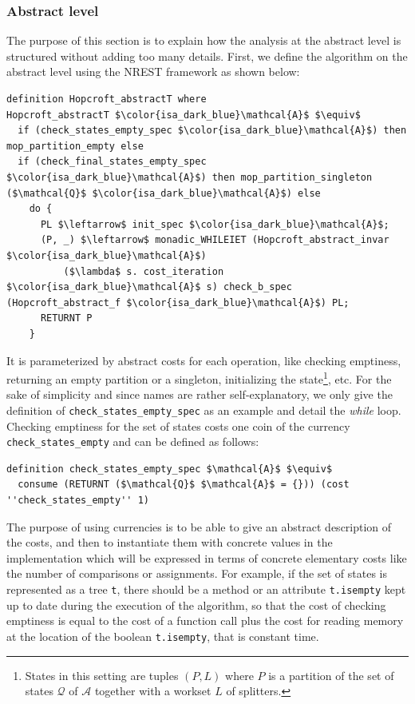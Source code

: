 \documentclass[12pt, a4 paper]{article}
\theoremstyle{definition}
\begin{document}
\subsubsection{Abstract level}
The purpose of this section is to explain how the analysis at the abstract level is structured without adding too many details.
First, we define the algorithm on the abstract level using the NREST framework as shown below:
\begin{lstlisting}[language=Isabelle]
definition Hopcroft_abstractT where
Hopcroft_abstractT $\color{isa_dark_blue}\mathcal{A}$ $\equiv$
  if (check_states_empty_spec $\color{isa_dark_blue}\mathcal{A}$) then mop_partition_empty else 
  if (check_final_states_empty_spec $\color{isa_dark_blue}\mathcal{A}$) then mop_partition_singleton ($\mathcal{Q}$ $\color{isa_dark_blue}\mathcal{A}$) else
    do {
      PL $\leftarrow$ init_spec $\color{isa_dark_blue}\mathcal{A}$;
      (P, _) $\leftarrow$ monadic_WHILEIET (Hopcroft_abstract_invar $\color{isa_dark_blue}\mathcal{A}$) 
          ($\lambda$ s. cost_iteration $\color{isa_dark_blue}\mathcal{A}$ s) check_b_spec (Hopcroft_abstract_f $\color{isa_dark_blue}\mathcal{A}$) PL;
      RETURNT P
    }
\end{lstlisting}
It is parameterized by abstract costs for each operation, like checking emptiness, returning an empty partition or a singleton, initializing the state\footnote{States in this setting are tuples $(P, L)$ where $P$ is a partition of the set of states $\mathcal{Q}$ of $\mathcal{A}$ together with a workset $L$ of splitters.}, etc.
For the sake of simplicity and since names are rather self-explanatory, we only give the definition of \texttt{check\_states\_empty\_spec} as an example and detail the \textit{while} loop. Checking emptiness for the set of states costs one coin of the currency \texttt{check\_states\_empty} and can be defined as follows:
\begin{lstlisting}[language=Isabelle]
definition check_states_empty_spec $\mathcal{A}$ $\equiv$
  consume (RETURNT ($\mathcal{Q}$ $\mathcal{A}$ = {})) (cost ''check_states_empty'' 1)
\end{lstlisting}
The purpose of using currencies is to be able to give an abstract description of the costs, and then to instantiate them with concrete values in the implementation which will be expressed in terms of concrete elementary costs like the number of comparisons or assignments. For example, if the set of states is represented as a tree \texttt{t}, there should be a method or an attribute \texttt{t.isempty} kept up to date during the execution of the algorithm, so that the cost of checking emptiness is equal to the cost of a function call plus the cost for reading memory at the location of the boolean \texttt{t.isempty}, that is constant time.
\end{document}
